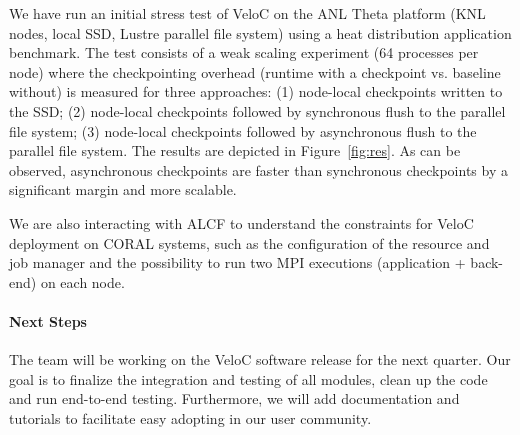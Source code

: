 We have run an initial stress test of VeloC on the ANL Theta platform
(KNL nodes, local SSD, Lustre parallel file system) using a heat
distribution application benchmark. The test consists of a weak
scaling experiment (64 processes per node) where the checkpointing
overhead (runtime with a checkpoint vs. baseline without) is measured
for three approaches: (1) node-local checkpoints written to the SSD;
(2) node-local checkpoints followed by synchronous flush to the
parallel file system; (3) node-local checkpoints followed by
asynchronous flush to the parallel file system.  The results are
depicted in Figure~\ref{fig:res}. As can be observed, asynchronous
checkpoints are faster than synchronous checkpoints by a significant
margin and more scalable.

We are also interacting with ALCF to understand the constraints for
VeloC deployment on CORAL systems, such as the configuration of the
resource and job manager and the possibility to run two MPI executions
(application + back-end) on each node.

\paragraph{Next Steps}


The team will be working on the VeloC software release for the next quarter.
Our goal is to finalize the integration and testing of all modules, clean up
the code and run end-to-end testing. Furthermore, we will add documentation
and tutorials to facilitate easy adopting in our user community.
